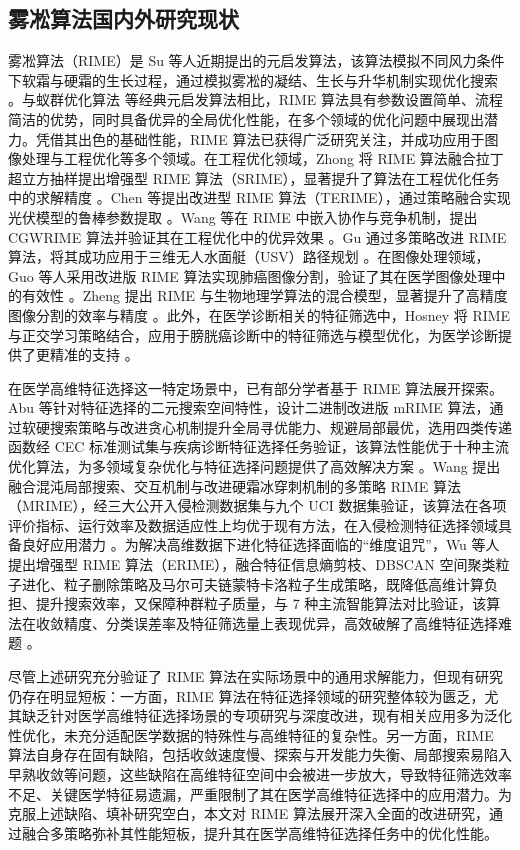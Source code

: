 \documentclass{wzuthesis}
\begin{document}
\subsection {雾凇算法国内外研究现状}
雾凇算法（RIME）是 Su 等人近期提出的元启发算法，该算法模拟不同风力条件下软霜与硬霜的生长过程，通过模拟雾凇的凝结、生长与升华机制实现优化搜索 。与蚁群优化算法  等经典元启发算法相比，RIME 算法具有参数设置简单、流程简洁的优势，同时具备优异的全局优化性能，在多个领域的优化问题中展现出潜力。凭借其出色的基础性能，RIME 算法已获得广泛研究关注，并成功应用于图像处理与工程优化等多个领域。在工程优化领域，Zhong 将 RIME 算法融合拉丁超立方抽样提出增强型 RIME 算法（SRIME），显著提升了算法在工程优化任务中的求解精度 。Chen 等提出改进型 RIME 算法（TERIME），通过策略融合实现光伏模型的鲁棒参数提取 。Wang 等在 RIME 中嵌入协作与竞争机制，提出 CGWRIME 算法并验证其在工程优化中的优异效果 。Gu 通过多策略改进 RIME 算法，将其成功应用于三维无人水面艇（USV）路径规划 。在图像处理领域，Guo 等人采用改进版 RIME 算法实现肺癌图像分割，验证了其在医学图像处理中的有效性 。Zheng 提出 RIME 与生物地理学算法的混合模型，显著提升了高精度图像分割的效率与精度 。此外，在医学诊断相关的特征筛选中，Hosney 将 RIME 与正交学习策略结合，应用于膀胱癌诊断中的特征筛选与模型优化，为医学诊断提供了更精准的支持 。

在医学高维特征选择这一特定场景中，已有部分学者基于 RIME 算法展开探索。Abu 等针对特征选择的二元搜索空间特性，设计二进制改进版 mRIME 算法，通过软硬搜索策略与改进贪心机制提升全局寻优能力、规避局部最优，选用四类传递函数经 CEC 标准测试集与疾病诊断特征选择任务验证，该算法性能优于十种主流优化算法，为多领域复杂优化与特征选择问题提供了高效解决方案 。Wang 提出融合混沌局部搜索、交互机制与改进硬霜冰穿刺机制的多策略 RIME 算法（MRIME），经三大公开入侵检测数据集与九个 UCI 数据集验证，该算法在各项评价指标、运行效率及数据适应性上均优于现有方法，在入侵检测特征选择领域具备良好应用潜力 。为解决高维数据下进化特征选择面临的“维度诅咒”，Wu 等人提出增强型 RIME 算法（ERIME），融合特征信息熵剪枝、DBSCAN 空间聚类粒子进化、粒子删除策略及马尔可夫链蒙特卡洛粒子生成策略，既降低高维计算负担、提升搜索效率，又保障种群粒子质量，与 7 种主流智能算法对比验证，该算法在收敛精度、分类误差率及特征筛选量上表现优异，高效破解了高维特征选择难题 。

尽管上述研究充分验证了 RIME 算法在实际场景中的通用求解能力，但现有研究仍存在明显短板：一方面，RIME 算法在特征选择领域的研究整体较为匮乏，尤其缺乏针对医学高维特征选择场景的专项研究与深度改进，现有相关应用多为泛化性优化，未充分适配医学数据的特殊性与高维特征的复杂性。另一方面，RIME 算法自身存在固有缺陷，包括收敛速度慢、探索与开发能力失衡、局部搜索易陷入早熟收敛等问题，这些缺陷在高维特征空间中会被进一步放大，导致特征筛选效率不足、关键医学特征易遗漏，严重限制了其在医学高维特征选择中的应用潜力。为克服上述缺陷、填补研究空白，本文对 RIME 算法展开深入全面的改进研究，通过融合多策略弥补其性能短板，提升其在医学高维特征选择任务中的优化性能。
\end{document}
